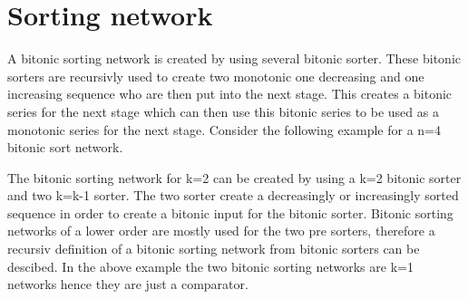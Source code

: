 \documentclass{article}
\newcommand{\compareBlock}[2][]{
    \pgfkeys{/compareBlock, default, #1}%
    \coordinate (\cbName_a) at ($(0, 1.33) + #2$);
    \coordinate (\cbName_b) at ($(0, 0.66) + #2$);
    \coordinate (\cbName_l) at ($(1.5, 0.66) + #2$);
    \coordinate (\cbName_h) at ($(1.5, 1.33) + #2$);

    \draw[color=\cbCA] (\cbName_a) -- ++(0.2, 0)node[anchor=west]{\cbA};
    \draw[color=\cbCB] (\cbName_b) -- ++(0.2, 0)node[anchor=west]{\cbB};
    \draw[color=\cbCL] (\cbName_l) -- ++(-0.2, 0)node[anchor=east]{\cbL};
    \draw[color=\cbCH] (\cbName_h) -- ++(-0.2, 0)node[anchor=east]{\cbH};
    \draw[draw=black] #2 rectangle ++(1.5,2);
}
\newcommand{\connectCB}[3]{
    \draw[color=#3] (#1) -- (#2);
}
\newcommand{\outputCB}[3]{
    \coordinate (#2) at ($(#1_h) + (0.25, 0)$);
    \coordinate (#3) at ($(#1_l) + (0.25, 0)$);
    \node at (#2) [anchor=west]{#2};
    \node at (#3) [anchor=west]{#3};
    \connectCB{#2}{#1_h}{black}
    \connectCB{#3}{#1_l}{black}
}
\begin{document}
\section{Sorting network}

A bitonic sorting network is created by using several bitonic sorter. 
These bitonic sorters are recursivly used to create two monotonic one decreasing and one increasing sequence who are then put into the next stage.
This creates a bitonic series for the next stage which can then use this bitonic series to be used as a monotonic series for the next stage.
Consider the following example for a n=4 bitonic sort network.


The bitonic sorting network for k=2 can be created by using a k=2 bitonic sorter and two k=k-1 sorter.
The two sorter create a decreasingly or increasingly sorted sequence in order to create a bitonic input for the bitonic sorter.
Bitonic sorting networks of a lower order are mostly used for the two pre sorters, therefore a recursiv definition of a bitonic sorting network from bitonic sorters can be descibed.
In the above example the two bitonic sorting networks are k=1 networks hence they are just a comparator.
\end{document}
